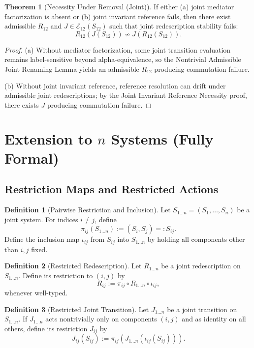 \documentclass[11pt]{article}
\theoremstyle{definition}
\newtheorem{definition}{Definition}
\newtheorem{theorem}{Theorem}
\begin{document}
\begin{theorem}[Necessity Under Removal (Joint)]
If either (a) joint mediator factorization is absent or (b) joint invariant reference fails, then there exist admissible $R_{12}$ and $J\in\mathcal{E}_{12}(S_{12})$
such that joint redescription stability fails:
\[
R_{12}(J(S_{12}))\not\sim J(R_{12}(S_{12})).
\]
\end{theorem}

\begin{proof}
(a) Without mediator factorization, some joint transition evaluation remains label-sensitive beyond alpha-equivalence, so the Nontrivial Admissible Joint Renaming Lemma
yields an admissible $R_{12}$ producing commutation failure.

(b) Without joint invariant reference, reference resolution can drift under admissible joint redescriptions; by the Joint Invariant Reference Necessity proof, there exists
$J$ producing commutation failure.
\end{proof}

\section{Extension to $n$ Systems (Fully Formal)}

\subsection{Restriction Maps and Restricted Actions}

\begin{definition}[Pairwise Restriction and Inclusion]
Let $S_{1\ldots n}=(S_1,\ldots,S_n)$ be a joint system. For indices $i\neq j$, define
\[
\pi_{ij}(S_{1\ldots n}) := (S_i,S_j)=:S_{ij}.
\]
Define the inclusion map $\iota_{ij}$ from $S_{ij}$ into $S_{1\ldots n}$ by holding all components other than $i,j$ fixed.
\end{definition}

\begin{definition}[Restricted Redescription]
Let $R_{1\ldots n}$ be a joint redescription on $S_{1\ldots n}$. Define its restriction to $(i,j)$ by
\[
R_{ij} := \pi_{ij}\circ R_{1\ldots n}\circ \iota_{ij},
\]
whenever well-typed.
\end{definition}

\begin{definition}[Restricted Joint Transition]
Let $J_{1\ldots n}$ be a joint transition on $S_{1\ldots n}$. If $J_{1\ldots n}$ acts nontrivially only on components $(i,j)$ and as identity on all others,
define its restriction $J_{ij}$ by
\[
J_{ij}(S_{ij}) := \pi_{ij}\!\left(J_{1\ldots n}(\iota_{ij}(S_{ij}))\right).
\]
\end{definition}
\end{document}
